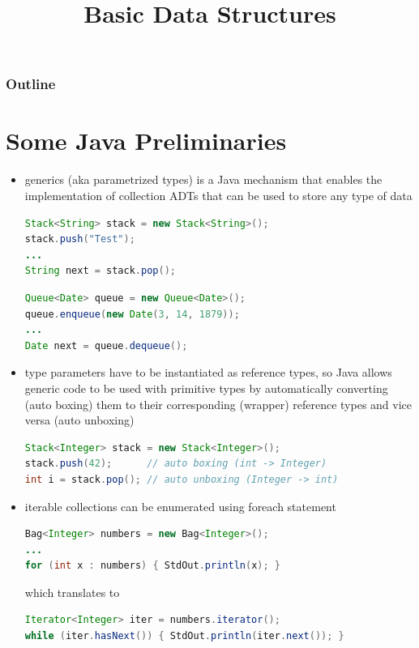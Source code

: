 \documentclass[8pt,a4paper,compress]{beamer}
\title{Basic Data Structures}
\date{}
\begin{document}
\begin{frame}
\vfill
\titlepage
\end{frame}

\begin{frame}
\frametitle{Outline}
\tableofcontents
\end{frame}

\section{Some Java Preliminaries}
\begin{frame}[fragile]
\begin{itemize}
\item generics (aka parametrized types) is a Java mechanism that enables the implementation of collection ADTs that can be used to store any type of data

\begin{lstlisting}[language=Java]
Stack<String> stack = new Stack<String>();
stack.push("Test");
...
String next = stack.pop();
\end{lstlisting}

\begin{lstlisting}[language=Java]
Queue<Date> queue = new Queue<Date>();
queue.enqueue(new Date(3, 14, 1879));
...
Date next = queue.dequeue();
\end{lstlisting}

\item type parameters have to be instantiated as reference types, so Java allows generic code to be used with primitive types by automatically converting (auto boxing) them to their corresponding (wrapper) reference types and vice versa (auto unboxing)
\begin{lstlisting}[language=Java]
Stack<Integer> stack = new Stack<Integer>();
stack.push(42);      // auto boxing (int -> Integer)
int i = stack.pop(); // auto unboxing (Integer -> int)
\end{lstlisting}

\item iterable collections can be enumerated using foreach statement 
\begin{lstlisting}[language=Java]
Bag<Integer> numbers = new Bag<Integer>();
...
for (int x : numbers) { StdOut.println(x); }
\end{lstlisting}

which translates to 

\begin{lstlisting}[language=Java]
Iterator<Integer> iter = numbers.iterator();
while (iter.hasNext()) { StdOut.println(iter.next()); }
\end{lstlisting}
\end{itemize}
\end{frame}
\end{document}

